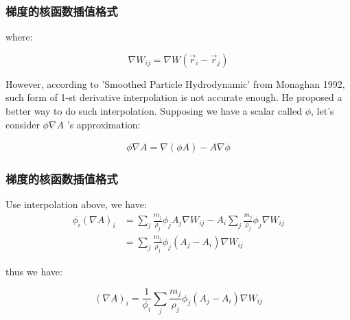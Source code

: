 \begin{frame}
    \frametitle{梯度的核函数插值格式}
    where:

\begin{equation}
    \nabla W_{ij} = \nabla W(\vec{r}_i - \vec{r}_j)
\end{equation}

However, according to 'Smoothed Particle Hydrodynamic' from Monaghan 1992, 
such form of 1-st derivative interpolation is not accurate enough. 
He proposed a better way to do such interpolation. 
Supposing we have a scalar called $\phi$, let's consider $\phi\nabla A$ 's approximation:

\begin{equation}
    \begin{aligned}
        \phi\nabla A = \nabla(\phi A) - A\nabla\phi
    \end{aligned}
\end{equation}
\end{frame}

\begin{frame}
    \frametitle{梯度的核函数插值格式}

    Use interpolation above, we have:
\begin{equation}
    \begin{aligned}
        \phi_i (\nabla A)_i &= 
            \sum_j \frac{m_j}{\rho_j} \phi_j A_j \nabla W_{ij} -
            A_i\sum_j \frac{m_j}{\rho_j}  \phi_j \nabla W_{ij}\\
            &= \sum_j \frac{m_j}{\rho_j} \phi_j( A_j-A_i) \nabla W_{ij}
    \end{aligned}
\end{equation}

thus we have:

\begin{equation}
    (\nabla A)_i = \frac{1}{\phi_i}\sum_j \frac{m_j}{\rho_j} \phi_j( A_j-A_i) \nabla W_{ij} 
\end{equation}

\end{frame}

